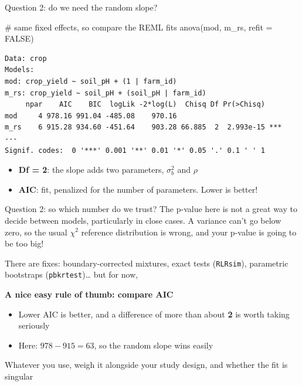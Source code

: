 \documentclass[
  ignorenonframetext,
  aspectratio=169,
]{beamer}
\newenvironment{Shaded}{\begin{snugshade}}{\end{snugshade}}
\newcommand{\AttributeTok}[1]{\textcolor[rgb]{0.40,0.45,0.13}{#1}}
\newcommand{\CommentTok}[1]{\textcolor[rgb]{0.37,0.37,0.37}{#1}}
\newcommand{\ConstantTok}[1]{\textcolor[rgb]{0.56,0.35,0.01}{#1}}
\newcommand{\FunctionTok}[1]{\textcolor[rgb]{0.28,0.35,0.67}{#1}}
\newcommand{\NormalTok}[1]{\textcolor[rgb]{0.00,0.23,0.31}{#1}}
\providecommand{\tightlist}{%
  \setlength{\itemsep}{0pt}\setlength{\parskip}{0pt}}\usepackage{longtable,booktabs,array}
\begin{document}
\begin{frame}[fragile]{Question 2: do we need the random slope?}
\label{question-2-do-we-need-the-random-slope}
\scriptsize

\begin{Shaded}
\begin{Highlighting}[]
\CommentTok{\# same fixed effects, so compare the REML fits}
\FunctionTok{anova}\NormalTok{(mod, m\_rs, }\AttributeTok{refit =} \ConstantTok{FALSE}\NormalTok{)}
\end{Highlighting}
\end{Shaded}

\begin{verbatim}
Data: crop
Models:
mod: crop_yield ~ soil_pH + (1 | farm_id)
m_rs: crop_yield ~ soil_pH + (soil_pH | farm_id)
     npar    AIC    BIC  logLik -2*log(L)  Chisq Df Pr(>Chisq)    
mod     4 978.16 991.04 -485.08    970.16                         
m_rs    6 915.28 934.60 -451.64    903.28 66.885  2  2.993e-15 ***
---
Signif. codes:  0 '***' 0.001 '**' 0.01 '*' 0.05 '.' 0.1 ' ' 1
\end{verbatim}

\normalsize

\pause

\begin{itemize}
\tightlist
\item
  \textbf{Df = 2}: the slope adds two parameters, \(\sigma^2_b\) and
  \(\rho\)
\item
  \textbf{AIC}: fit, penalized for the number of parameters. Lower is
  better!
\end{itemize}
\end{frame}

\begin{frame}[fragile]{Question 2: so which number do we trust?}
\label{question-2-so-which-number-do-we-trust}
The p-value here is not a great way to decide between models,
particularly in close cases. A variance can't go below zero, so the
usual \(\chi^2\) reference distribution is wrong, and your p-value is
going to be too big!

\pause

There are fixes: boundary-corrected mixtures, exact tests
(\texttt{RLRsim}), parametric bootstraps (\texttt{pbkrtest})\ldots{} but
for now,

\begin{center}
\textbf{A nice easy rule of thumb: compare AIC}
\end{center}

\begin{itemize}
\tightlist
\item
  Lower AIC is better, and a difference of more than about \textbf{2} is
  worth taking seriously
\item
  Here: \(978 - 915 = 63\), so the random slope wins easily
\end{itemize}

\pause

\begin{center}
\small
Whatever you use, weigh it alongside your study design, and whether the fit is singular
\end{center}
\end{frame}
\end{document}
